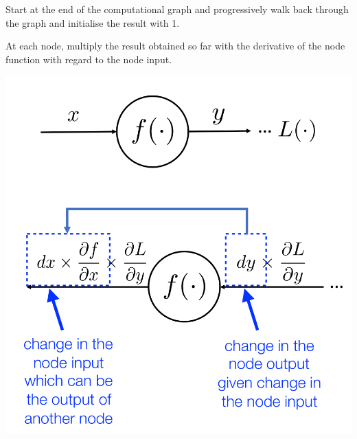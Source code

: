 \documentclass[11pt]{article}
\begin{document}
\noindent
\begin{minipage}{0.6\linewidth}
	Start at the end of the computational graph and progressively walk back through the graph and initialise the result with 1.
	
	At each node, multiply the result obtained so far with the derivative of the node function with regard to the node input.
\end{minipage}
\begin{minipage}{0.4\linewidth}
	\centering
	\includegraphics[width=\linewidth]{img/backprop_contrib_node}
\end{minipage}
\end{document}
